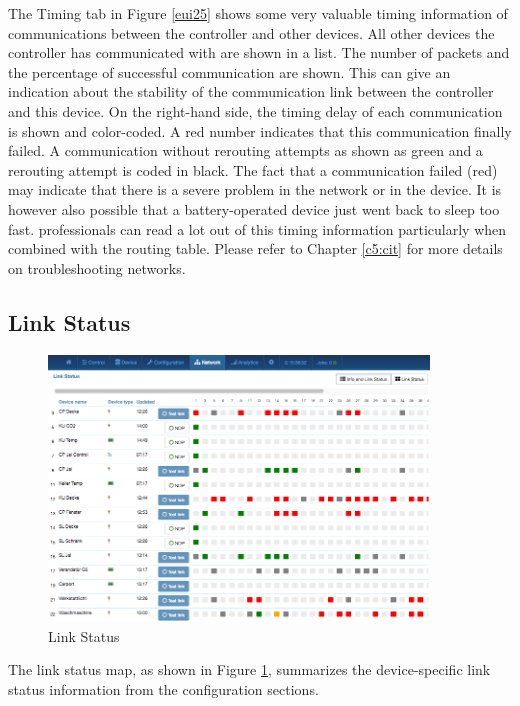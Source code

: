 {The Timing tab in Figure \ref{eui25} shows some very valuable timing information of 
communications between the controller and other devices. All other devices the controller 
has communicated with are shown in a list. The number of packets and the percentage of 
successful communication are shown. This can give an indication about the stability of 
the communication link between the controller and this device. On the right-hand side, 
the timing delay of each communication is shown and color-coded. A red number indicates 
that this communication finally failed. A communication without rerouting attempts as 
shown as green and a rerouting attempt is coded in black. The fact that a communication 
failed (red) may indicate that there is a severe problem in the network or in the device. 
It is however also possible that a battery-operated device just went back to sleep too fast. 
\zwave professionals can read a lot out of this timing information particularly when combined 
with the routing table. Please refer to Chapter \ref{c5:cit} for more details on 
troubleshooting \zwave networks.


\subsection{Link Status}


\begin{figure}
\begin{center}
\includegraphics[width=0.9\textwidth]{pngs/cap7/eui26.png}
\caption{Link Status}
\label{eui26}
\end{center}
\end{figure}

The link status map, as shown in Figure \ref{eui26}, summarizes the device-specific link 
status information from the configuration sections.

}
